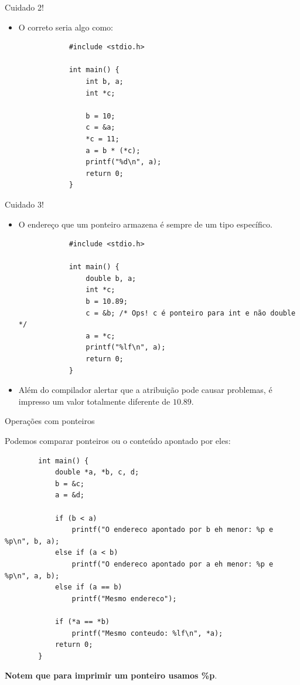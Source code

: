 \documentclass[handout]{beamer}
\begin{document}
\begin{frame}[fragile]{Cuidado 2!}
    \begin{itemize}
        \item O correto seria algo como:
        \begin{verbatim}
            #include <stdio.h>

            int main() {
                int b, a;
                int *c;

                b = 10;
                c = &a;
                *c = 11;
                a = b * (*c);
                printf("%d\n", a);
                return 0;
            }
        \end{verbatim}
    \end{itemize}
\end{frame}


\begin{frame}[fragile]{Cuidado 3!}
    \begin{itemize}
        \item O endereço que um ponteiro armazena é sempre de um tipo específico.
        \begin{verbatim}
            #include <stdio.h>

            int main() {
                double b, a;
                int *c;
                b = 10.89;
                c = &b; /* Ops! c é ponteiro para int e não double */
                a = *c;
                printf("%lf\n", a);
                return 0;
            }
        \end{verbatim}
        \item Além do compilador alertar que a atribuição pode causar problemas, é impresso
        um valor totalmente diferente de $10.89$.
    \end{itemize}
\end{frame}

\begin{frame}[fragile]{Operações com ponteiros}

    Podemos comparar ponteiros ou o conteúdo apontado por eles:
    \begin{verbatim}
        int main() {
            double *a, *b, c, d;
            b = &c;
            a = &d;

            if (b < a)
                printf("O endereco apontado por b eh menor: %p e %p\n", b, a);
            else if (a < b)
                printf("O endereco apontado por a eh menor: %p e %p\n", a, b);
            else if (a == b)
                printf("Mesmo endereco");

            if (*a == *b)
                printf("Mesmo conteudo: %lf\n", *a);
            return 0;
        }
    \end{verbatim}

    {\bf Notem que para imprimir um ponteiro usamos \%p}.
\end{frame}
\end{document}
